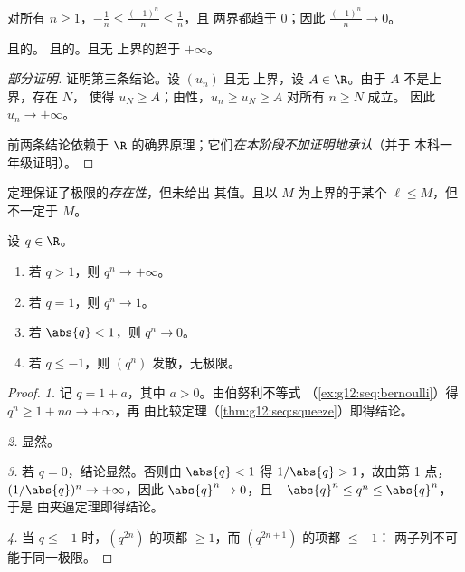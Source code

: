 \begin{example}
对所有 $n \geq 1$，$-\frac{1}{n} \leq \frac{(-1)^n}{n} \leq \frac{1}{n}$，且
两界都趋于 $0$；因此 $\frac{(-1)^n}{n} \to 0$。
\end{example}

\begin{theorem}[单调收敛定理]\label{thm:g12:seq:monotone}
且的。
且的。且无
上界的趋于 $+\infty$。
\end{theorem}

\begin{proof}[部分证明]
证明第三条结论。设 $(u_n)$ 且无
上界，设 $A \in \R$。由于 $A$ 不是上界，存在 $N$，
使得 $u_N \geq A$；由性，$u_n \geq u_N \geq A$ 对所有 $n \geq N$ 成立。
因此 $u_n \to +\infty$。

前两条结论依赖于
$\R$ 的确界原理；它们\emph{在本阶段不加证明地承认}（并于
本科一年级证明）。
\end{proof}

\begin{remark}
定理保证了极限的\emph{存在性}，但未给出
其值。且以 $M$ 为上界的于某个
$\ell \leq M$，但不一定于 $M$。
\end{remark}

\begin{theorem}[等比数列的极限]\label{thm:g12:seq:geometric}
设 $q \in \R$。
\begin{enumerate}
  \item 若 $q > 1$，则 $q^n \to +\infty$。
  \item 若 $q = 1$，则 $q^n \to 1$。
  \item 若 $\abs{q} < 1$，则 $q^n \to 0$。
  \item 若 $q \leq -1$，则 $(q^n)$ 发散，无极限。
\end{enumerate}
\end{theorem}

\begin{proof}
\emph{1.} 记 $q = 1 + a$，其中 $a > 0$。由伯努利不等式
（\cref{ex:g12:seq:bernoulli}）得 $q^n \geq 1 + na \to +\infty$，再
由比较定理（\cref{thm:g12:seq:squeeze}）即得结论。

\emph{2.} 显然。

\emph{3.} 若 $q = 0$，结论显然。否则由 $\abs{q} < 1$ 得
$1/\abs{q} > 1$，故由第 1 点，$(1/\abs{q})^n \to +\infty$，因此
$\abs{q}^n \to 0$，且 $-\abs{q}^n \leq q^n \leq \abs{q}^n$，于是
由夹逼定理即得结论。

\emph{4.} 当 $q \leq -1$ 时，$(q^{2n})$ 的项都 $\geq 1$，而
$(q^{2n+1})$ 的项都 $\leq -1$：
两子列不可能于同一极限。
\end{proof}

